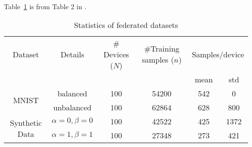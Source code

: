 \documentclass{article} %
\begin{document}
Table~\ref{tab:li2020convergence} is from Table 2 in \cite{li2020convergence}. 

\begin{table}[ht]
    \caption{Statistics of federated datasets}
    \label{tab:li2020convergence}
    \begin{center}
    \begin{tabular}{cccccc}
    \toprule
        Dataset & Details & \# Devices ($N$) & \#Training samples ($n$) & \multicolumn{2}{c}{Samples/device} \\ \cmidrule(lr){5-6}
         & & & & mean & std \\ \midrule
        \multirow{2}{*}{MNIST} & balanced & 100 & 54200 & 542 & 0 \\
        & unbalanced & 100 & 62864 & 628 & 800 \\ \midrule
        \multirow{2}{*}{Synthetic Data} & $\alpha = 0, \beta = 0$ & 100 & 42522 & 425 & 1372 \\
        & $\alpha = 1, \beta = 1$ & 100 & 27348 & 273 & 421 \\
    \bottomrule
    \end{tabular}
    \end{center}
\end{table}




\end{document}
